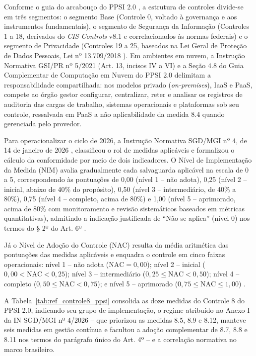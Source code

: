 Conforme o guia do arcabouço do PPSI 2.0 \cite{ppsi2026}, a estrutura de controles divide-se em três segmentos: o segmento Base (Controle 0, voltado à governança e aos instrumentos fundamentais), o segmento de Segurança da Informação (Controles 1 a 18, derivados do \textit{CIS Controls} v8.1 e correlacionados às normas federais) e o segmento de Privacidade (Controles 19 a 25, baseados na Lei Geral de Proteção de Dados Pessoais, Lei nº 13.709/2018 \cite{lgpd2018}). Em ambientes em nuvem, a Instrução Normativa GSI/PR nº 5/2021 (Art. 13, incisos IV a VI) \cite{ingsi5_2021} e a Seção 4.8 do Guia Complementar de Computação em Nuvem do PPSI 2.0 \cite{guianuvem2025} delimitam a responsabilidade compartilhada: nos modelos privado (\textit{on-premises}), IaaS e PaaS, compete ao órgão gestor configurar, centralizar, reter e analisar os registros de auditoria das cargas de trabalho, sistemas operacionais e plataformas sob seu controle, ressalvada em PaaS a não aplicabilidade da medida 8.4 quando gerenciada pelo provedor.

Para operacionalizar o ciclo de 2026, a Instrução Normativa SGD/MGI nº 4, de 14 de janeiro de 2026 \cite{in4_2026}, classificou o rol de medidas aplicáveis e formalizou o cálculo da conformidade por meio de dois indicadores. O Nível de Implementação da Medida (NIM) avalia gradualmente cada salvaguarda aplicável na escala de 0 a 5, correspondendo às pontuações de 0,00 (nível 1 -- não adota), 0,25 (nível 2 -- inicial, abaixo de 40\% do propósito), 0,50 (nível 3 -- intermediário, de 40\% a 80\%), 0,75 (nível 4 -- completo, acima de 80\%) e 1,00 (nível 5 -- aprimorado, acima de 80\% com monitoramento e revisão sistemáticos baseados em métricas quantitativas), admitindo a indicação justificada de ``Não se aplica'' (nível 0) nos termos do § 2º do Art. 6º \cite{in4_2026}.

Já o Nível de Adoção do Controle (NAC) resulta da média aritmética das pontuações das medidas aplicáveis e enquadra o controle em cinco faixas operacionais: nível 1 -- não adota ($\mathrm{NAC} = 0{,}00$); nível 2 -- inicial ($0{,}00 < \mathrm{NAC} < 0{,}25$); nível 3 -- intermediário ($0{,}25 \le \mathrm{NAC} < 0{,}50$); nível 4 -- completo ($0{,}50 \le \mathrm{NAC} < 0{,}75$); e nível 5 -- aprimorado ($0{,}75 \le \mathrm{NAC} \le 1{,}00$) \cite{in4_2026}.

A Tabela~\ref{tab:ref_controle8_ppsi} consolida as doze medidas do Controle 8 do PPSI 2.0, indicando seu grupo de implementação, o regime atribuído no Anexo I da IN SGD/MGI nº 4/2026 -- que priorizou as medidas 8.5, 8.9 e 8.12, manteve seis medidas em gestão contínua e facultou a adoção complementar de 8.7, 8.8 e 8.11 nos termos do parágrafo único do Art. 4º \cite{in4_2026} -- e a correlação normativa no marco brasileiro.

